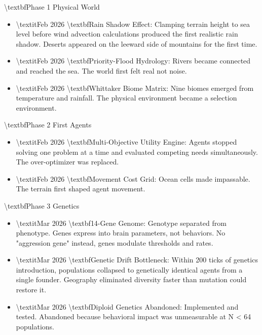 \documentclass[11pt,a4paper]{article}
\begin{document}
\textbackslash{}textbf{Phase 1  Physical World}
\begin{itemize}
  \item \textbackslash{}textit{Feb 2026}  \textbackslash{}textbf{Rain Shadow Effect}: Clamping terrain height to sea level before wind advection calculations produced the first realistic rain shadow. Deserts appeared on the leeward side of mountains for the first time.
  \item \textbackslash{}textit{Feb 2026}  \textbackslash{}textbf{Priority-Flood Hydrology}: Rivers became connected and reached the sea. The world first felt real  not noise.
  \item \textbackslash{}textit{Feb 2026}  \textbackslash{}textbf{Whittaker Biome Matrix}: Nine biomes emerged from temperature and rainfall. The physical environment became a selection environment.
\end{itemize}

\textbackslash{}textbf{Phase 2  First Agents}
\begin{itemize}
  \item \textbackslash{}textit{Feb 2026}  \textbackslash{}textbf{Multi-Objective Utility Engine}: Agents stopped solving one problem at a time and evaluated competing needs simultaneously. The over-optimizer was replaced.
  \item \textbackslash{}textit{Feb 2026}  \textbackslash{}textbf{Movement Cost Grid}: Ocean cells made impassable. The terrain first shaped agent movement.
\end{itemize}

\textbackslash{}textbf{Phase 3  Genetics}
\begin{itemize}
  \item \textbackslash{}textit{Mar 2026}  \textbackslash{}textbf{14-Gene Genome}: Genotype separated from phenotype. Genes express into brain parameters, not behaviors. No "aggression gene"  instead, genes modulate thresholds and rates.
  \item \textbackslash{}textit{Mar 2026}  \textbackslash{}textbf{Genetic Drift Bottleneck}: Within 200 ticks of genetics introduction, populations collapsed to genetically identical agents from a single founder. Geography eliminated diversity faster than mutation could restore it.
  \item \textbackslash{}textit{Mar 2026}  \textbackslash{}textbf{Diploid Genetics Abandoned}: Implemented and tested. Abandoned because behavioral impact was unmeasurable at N \textless{} 64 populations.
\end{itemize}
\end{document}
